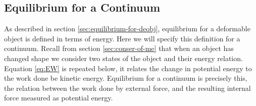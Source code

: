 






\subsection{Equilibrium for a Continuum}
\label{sec:equilibrium-for-a-continuum}
As described in section \vref{sec:equilibrium-for-deobj}, equilibrium
for a deformable object is defined in terms of energy. Here we will
specify this definition for a continuum. Recall from section
\vref{sec:conser-of-me} that when an object has changed shape we
consider two states of the object and their energy relation. Equation
\eqref{eq:EW} is repeated below, it relates the
change in potential energy to the work done be kinetic
energy. Equilibrium for a continuum is precisely this, the relation
between the work done by external force, and the resulting internal
force measured as potential energy.


